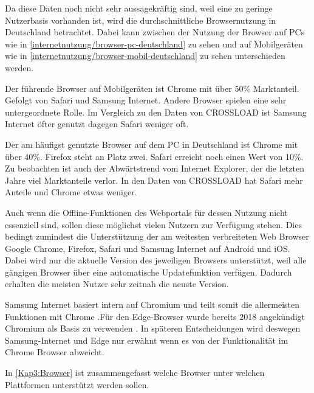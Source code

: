 Da diese Daten noch nicht sehr aussagekräftig sind, weil eine zu geringe Nutzerbasis vorhanden ist, wird die durchschnittliche Browsernutzung in Deutschland betrachtet. Dabei kann zwischen der Nutzung der Browser auf PCs wie in \autoref{internetnutzung/browser-pc-deutschland} zu sehen und auf Mobilgeräten wie in \autoref{internetnutzung/browser-mobil-deutschland} zu sehen unterschieden werden. 


Der führende Browser auf Mobilgeräten ist Chrome mit über 50\% Marktanteil. Gefolgt von Safari und Samsung Internet. Andere Browser spielen eine sehr untergeordnete Rolle. Im Vergleich zu den Daten von CROSSLOAD ist Samsung Internet öfter genutzt dagegen Safari weniger oft.


Der am häufigst genutzte Browser auf dem PC in Deutschland ist Chrome mit über 40\%. Firefox steht an Platz zwei. Safari erreicht noch einen Wert von 10\%. Zu beobachten ist auch der Abwärtstrend vom Internet Explorer, der die letzten Jahre viel Marktanteile verlor. In den Daten von CROSSLOAD hat Safari mehr Anteile und Chrome etwas weniger.

Auch wenn die Offline-Funktionen des Webportals für dessen Nutzung nicht essenziell sind, sollen diese möglichst vielen Nutzern zur Verfügung stehen. Dies bedingt zumindest die Unterstützung der am weitesten verbreiteten Web Browser Google Chrome, Firefox, Safari und Samsung Internet auf Android und iOS. Dabei wird nur die aktuelle Version des jeweiligen Browsers unterstützt, weil alle gängigen Browser über eine automatische Updatefunktion verfügen. Dadurch erhalten die meisten Nutzer sehr zeitnah die neuste Version.

Samsung Internet basiert intern auf Chromium und teilt somit die allermeisten Funktionen mit Chrome \autocite{samsung-webkit}.Für den Edge-Browser wurde bereits 2018 angekündigt Chromium als Basis zu verwenden \autocite{edge-faq}. In späteren Entscheidungen wird deswegen Samsung-Internet und Edge nur erwähnt wenn es von der Funktionalität im Chrome Browser abweicht.

In \autoref{Kap3:Browser} ist zusammengefasst welche Browser unter welchen Plattformen unterstützt werden sollen.

